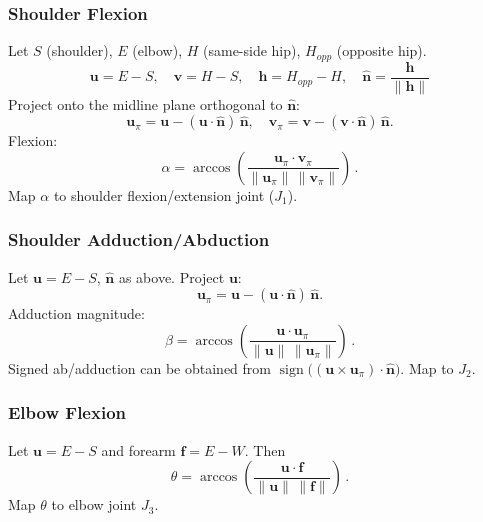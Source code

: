 \documentclass[sigconf]{acmart}
\begin{document}
\subsubsection{Shoulder Flexion}
Let $S$ (shoulder), $E$ (elbow), $H$ (same-side hip), $H_{opp}$ (opposite hip).
\begin{displaymath}
  \mathbf{u}=E-S,\quad \mathbf{v}=H-S,\quad \mathbf{h}=H_{opp}-H,\quad \hat{\mathbf{n}}=\frac{\mathbf{h}}{\lVert\mathbf{h}\rVert}
\end{displaymath}
Project onto the midline plane orthogonal to $\hat{\mathbf{n}}$:
\begin{displaymath}
\mathbf{u}_\pi=\mathbf{u}-(\mathbf{u}\cdot\hat{\mathbf{n}})\,\hat{\mathbf{n}},\quad
\mathbf{v}_\pi=\mathbf{v}-(\mathbf{v}\cdot\hat{\mathbf{n}})\,\hat{\mathbf{n}}.
\end{displaymath}
Flexion:
\begin{equation}
\alpha=\arccos \!\left( \frac{\mathbf{u}_\pi \cdot \mathbf{v}_\pi}{\lVert\mathbf{u}_\pi\rVert\, \lVert\mathbf{v}_\pi\rVert} \right)\,.
\end{equation}
Map $\alpha$ to shoulder flexion/extension joint ($J_1$).

\subsubsection{Shoulder Adduction/Abduction}
Let $\mathbf{u}=E-S$, $\hat{\mathbf{n}}$ as above. Project $\mathbf{u}$:
\begin{displaymath}
\mathbf{u}_\pi=\mathbf{u}-(\mathbf{u}\cdot\hat{\mathbf{n}})\,\hat{\mathbf{n}}.
\end{displaymath}
Adduction magnitude:
\begin{equation}
\beta=\arccos \!\left( \frac{\mathbf{u}\cdot\mathbf{u}_\pi}{\lVert\mathbf{u}\rVert\, \lVert\mathbf{u}_\pi\rVert} \right)\,.
\end{equation}
Signed ab/adduction can be obtained from $\operatorname{sign}\big((\mathbf{u}\times\mathbf{u}_\pi)\cdot\hat{\mathbf{n}}\big)$. Map to $J_2$.

\subsubsection{Elbow Flexion}
Let $\mathbf{u}=E-S$ and forearm $\mathbf{f}=E-W$. Then
\begin{equation}
\theta=\arccos \!\left( \frac{\mathbf{u}\cdot\mathbf{f}}{\lVert\mathbf{u}\rVert\, \lVert\mathbf{f}\rVert} \right)\,.
\end{equation}
Map $\theta$ to elbow joint $J_3$.
\end{document}

